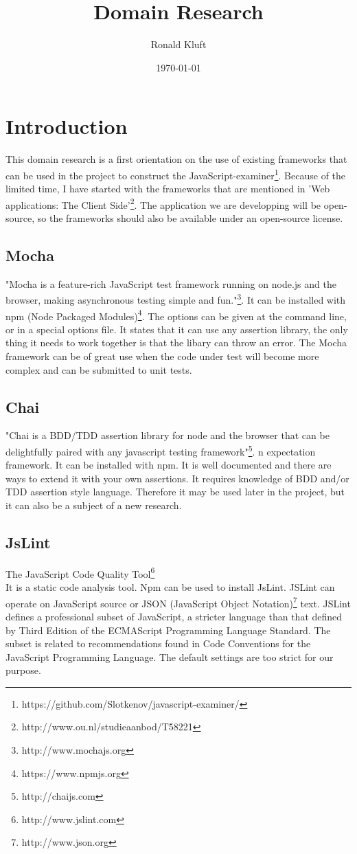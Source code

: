 \documentclass{article}
\begin{document}
\title{Domain Research}
\author{Ronald Kluft}
\date{\today}
\maketitle

\section{Introduction}
This domain research is a first orientation on the use of existing frameworks that can be used in the 
project to construct the JavaScript-examiner\footnote{https://github.com/Slotkenov/javascript-examiner/}.
Because of the limited time, I have started with the frameworks that are mentioned in 
'Web applications: The Client Side'\footnote{http://www.ou.nl/studieaanbod/T58221}.
The application we are developping will be open-source, so the frameworks should also be available
under an open-source license.

\subsection{Mocha}
"Mocha is a feature-rich JavaScript test framework running on node.js and the 
browser, making asynchronous testing simple and fun."\footnote{http://www.mochajs.org}.
It can be installed with npm (Node Packaged Modules)\footnote{https://www.npmjs.org}.
The options can be given at the command line, or in a special options file.
It states that it can use any assertion library, the only thing it needs to work together is that the libary can throw an error.
The Mocha framework can be of great use when the code under test will become more complex and can be submitted to unit tests.


\subsection{Chai}
"Chai is a BDD/TDD assertion library for node and the browser that can be delightfully paired with any javascript testing framework"\footnote{http://chaijs.com}.
n expectation framework. It can be installed with npm.
It is well documented and there are ways to extend it with your own assertions.
It requires knowledge of BDD and/or TDD assertion style language.
Therefore it may be used later in the project, but it can also be a subject of a new research.


\subsection{JsLint}
The JavaScript Code Quality Tool\footnote{http://www.jslint.com}\\
It is a static code analysis tool.
Npm can be used to install JsLint.
JSLint can operate on JavaScript source or JSON (JavaScript Object Notation)\footnote {http://www.json.org} text.
JSLint defines a professional subset of JavaScript, a stricter language than that defined by Third Edition of the ECMAScript Programming Language Standard.
The subset is related to recommendations found in Code Conventions for the JavaScript Programming Language.
The default settings are too strict for our purpose.
\end{document}
